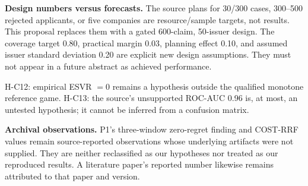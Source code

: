 \documentclass[11pt,a4paper]{article}
\newcommand{\pbreak}{\clearpage}
\newcommand{\lead}[1]{\textbf{\color{navy}#1}}
\begin{document}
\lead{Design numbers versus forecasts.} The source plans for 30/300 cases, 300--500 rejected applicants, or five companies are resource/sample targets, not results. This proposal replaces them with a gated 600-claim, 50-issuer design. The coverage target 0.80, practical margin 0.03, planning effect 0.10, and assumed issuer standard deviation 0.20 are explicit new design assumptions. They must not appear in a future abstract as achieved performance.

H-C12: empirical ESVR $=0$ remains a hypothesis outside the qualified monotone reference game. H-C13: the source's unsupported ROC-AUC 0.96 is, at most, an untested hypothesis; it cannot be inferred from a confusion matrix.

\lead{Archival observations.} P1's three-window zero-regret finding and COST-RRF values remain source-reported observations whose underlying artifacts were not supplied. They are neither reclassified as our hypotheses nor treated as our reproduced results. A literature paper's reported number likewise remains attributed to that paper and version.

\pbreak
\end{document}
